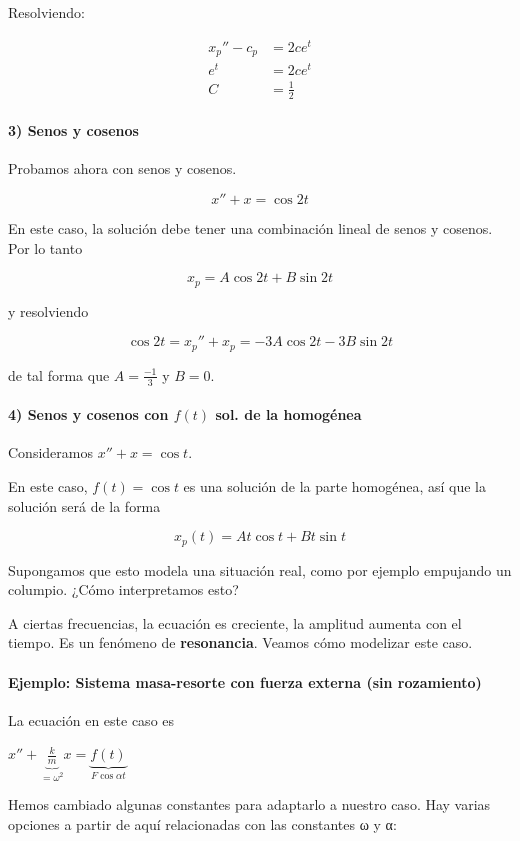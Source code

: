 Resolviendo:

\begin{align*}
x_p'' - c_p &= 2ce^t \\
e^t &= 2ce^t \\
C &= \frac{1}{2}
\end{align*}

\paragraph{3) Senos y cosenos} Probamos ahora con senos y cosenos.

\[ x'' + x= \cos 2t\]

En este caso, la solución debe tener una combinación lineal de senos y cosenos. Por lo tanto

\[ x_p = A\cos 2t + B\sin 2t \]

y resolviendo

\[ \cos 2t = x_p'' + x_p = -3A\cos 2t - 3B\sin 2t \]

de tal forma que $A=\frac{-1}{3}$ y $B=0$.

\paragraph{4) Senos y cosenos con $f(t)$ sol. de la homogénea} Consideramos $x''+x = \cos t$.

En este caso, $f(t) = \cos t$ es una solución de la parte homogénea, así que la solución será de la forma

\[ x_p(t) = At\cos t + Bt\sin t \]

Supongamos que esto modela una situación real, como por ejemplo empujando un columpio. ¿Cómo interpretamos esto?

A ciertas frecuencias, la ecuación es creciente, la amplitud aumenta con el tiempo. Es un fenómeno de \textbf{resonancia}. Veamos cómo modelizar este caso.

\paragraph{Ejemplo: Sistema masa-resorte con fuerza externa (sin rozamiento)}

La ecuación en este caso es

\(\label{eqMRF1} x'' + \underbrace{\frac{k}{m}}_{=ω^2}x = \underbrace{f(t)}_{F\cos αt} \)

Hemos cambiado algunas constantes para adaptarlo a nuestro caso. Hay varias opciones a partir de aquí relacionadas con las constantes ω y α:

